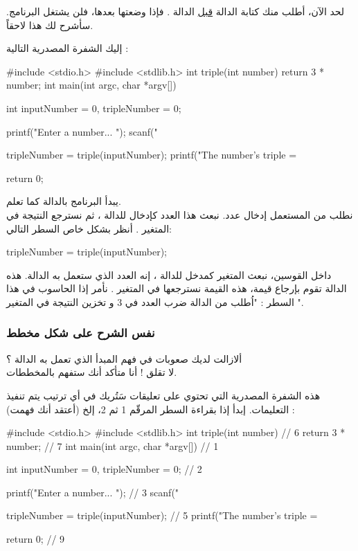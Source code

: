 لحد الآن، أطلب منك كتابة الدالة 
\underline{قبل}
الدالة 
.
فإذا وضعتها بعدها، فلن يشتغل البرنامج. سأشرح لك هذا لاحقاً.

إليك الشفرة المصدرية التالية :

\begin{Csource}
#include <stdio.h>
#include <stdlib.h>
int triple(int number)
{
	return 3 * number;
}   
int main(int argc, char *argv[])
{
	int inputNumber = 0, tripleNumber = 0;
	
	printf("Enter a number... ");
	scanf("%
	
	tripleNumber = triple(inputNumber);
	printf("The number's triple = %
	
	return 0;
}
\end{Csource}

يبدأ البرنامج بالدالة 
كما تعلم.\\
نطلب من المستعمل إدخال عدد. نبعث هذا العدد كإدخال للدالة 
،
ثم نسترجع النتيجة في المتغير 
.
أنظر بشكل خاص السطر التالي:

\begin{Csource}
tripleNumber = triple(inputNumber);
\end{Csource}

داخل القوسين، نبعث المتغير كمدخل للدالة 
،
إنه العدد الذي ستعمل به الدالة. هذه الدالة تقوم بإرجاع قيمة، هذه القيمة نسترجعها في المتغير 
.
نأمر إذا الحاسوب في هذا السطر : "اُطلب من الدالة 
ضرب العدد
في 3 و تخزين النتيجة في المتغير 
".

\subsubsection{نفس الشرح على شكل مخطط}

ألازالت لديك صعوبات في فهم المبدأ الذي تعمل به الدالة ؟\\
لا تقلق ! أنا متأكد أنك ستفهم بالمخططات.

هذه الشفرة المصدرية التي تحتوي على تعليقات سَتُريك في أي ترتيب يتم تنفيذ التعليمات. إبدأ إذا بقراءة السطر المرقّم 1 ثم 2، إلخ (أعتقد أنك فهمت) :

\begin{Csource}
#include <stdio.h>
#include <stdlib.h>
int triple(int number) // 6
{
	return 3 * number; // 7
}   
int main(int argc, char *argv[]) // 1
{
	int inputNumber = 0, tripleNumber = 0; // 2
	
	printf("Enter a number... "); // 3
	scanf("%
	
	tripleNumber = triple(inputNumber); // 5
	printf("The number's triple = %
	
	return 0; // 9
}
\end{Csource}

